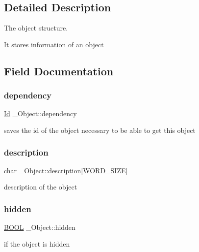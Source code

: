 \subsection{Detailed Description}
The object structure. 

It stores information of an object 

\subsection{Field Documentation}
\mbox{\label{struct__Object_afec53e4289e64d19508e1f04c93de411}} 
\subsubsection{\texorpdfstring{dependency}{dependency}}
{\footnotesize\ttfamily \hyperlink{types_8h_a845e604fb28f7e3d97549da3448149d3}{Id} \+\_\+\+Object\+::dependency}

saves the id of the object necessary to be able to get this object \mbox{\label{struct__Object_a556e2e37c1461bcaae6492d2101f407d}} 
\subsubsection{\texorpdfstring{description}{description}}
{\footnotesize\ttfamily char \+\_\+\+Object\+::description\mbox{[}\hyperlink{types_8h_a92ed8507d1cd2331ad09275c5c4c1c89}{W\+O\+R\+D\+\_\+\+S\+I\+ZE}\mbox{]}}

description of the object \mbox{\label{struct__Object_a44824966fc9f4d5f82c189b2e063ddc4}} 
\subsubsection{\texorpdfstring{hidden}{hidden}}
{\footnotesize\ttfamily \hyperlink{types_8h_a3e5b8192e7d9ffaf3542f1210aec18dd}{B\+O\+OL} \+\_\+\+Object\+::hidden}

if the object is hidden \mbox{\label{struct__Object_a3cff7a0e8dc4e9d23895ed9af1b7653a}} 
